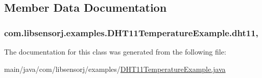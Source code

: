 \subsection{Member Data Documentation}
\hypertarget{classcom_1_1libsensorj_1_1examples_1_1DHT11TemperatureExample_ae5b24da8a75b04b9f313d9b4aaa2f058}{}
\subsubsection[{dht11}]{ com.\+libsensorj.\+examples.\+D\+H\+T11\+Temperature\+Example.\+dht11\hspace{0.3cm}{\ttfamily [static]}, {\ttfamily [private]}}\label{classcom_1_1libsensorj_1_1examples_1_1DHT11TemperatureExample_ae5b24da8a75b04b9f313d9b4aaa2f058}


The documentation for this class was generated from the following file\+:\begin{DoxyCompactItemize}
\item 
main/java/com/libsensorj/examples/\hyperlink{DHT11TemperatureExample_8java}{D\+H\+T11\+Temperature\+Example.\+java}\end{DoxyCompactItemize}
